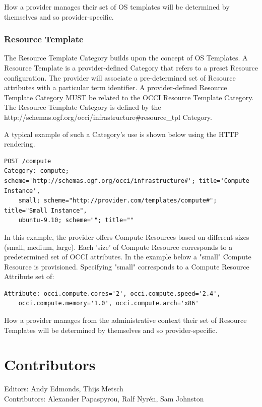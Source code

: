 \documentclass[10pt,a4paper]{article}
\begin{document}
How a provider manages their set of OS templates will be determined by themselves and so provider-specific.

\subsubsection{Resource Template}
The Resource Template Category builds upon the concept of OS Templates. A Resource Template is a provider-defined Category that refers to a preset Resource configuration. The provider will associate a pre-determined set of Resource attributes with a particular term identifier. A provider-defined Resource Template Category MUST be related to the OCCI Resource Template Category. The Resource Template Category is defined by the http://schemas.ogf.org/occi/infrastructure\#resource\_tpl Category.

A typical example of such a Category's use is shown below using the HTTP rendering. 

\begin{verbatim}
POST /compute
Category: compute; scheme='http://schemas.ogf.org/occi/infrastructure#'; title='Compute Instance', 
    small; scheme="http://provider.com/templates/compute#"; title="Small Instance", 
    ubuntu-9.10; scheme=""; title=""
\end{verbatim}

In this example, the provider offers Compute Resources based on different sizes (small, medium, large). Each 'size' of Compute Resource corresponds to a predetermined set of OCCI attributes. In the example below a "small" Compute Resource is provisioned. Specifying "small" corresponds to a Compute Resource Attribute set of:

\begin{verbatim}
Attribute: occi.compute.cores='2', occi.compute.speed='2.4', 
    occi.compute.memory='1.0', occi.compute.arch='x86'
\end{verbatim}

How a provider manages from the administrative context their set of Resource Templates will be determined by themselves and so provider-specific.


\section{Contributors}

Editors: Andy Edmonds, Thijs Metsch \\
Contributors: Alexander Papaspyrou, Ralf Nyr\'en, Sam Johnston
\end{document}
